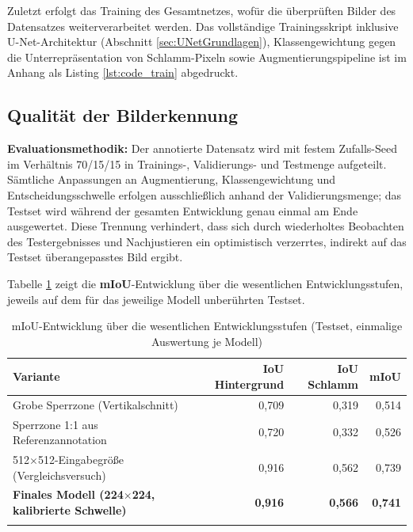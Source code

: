 Zuletzt erfolgt das Training des Gesamtnetzes, wofür die überprüften Bilder des Datensatzes weiterverarbeitet werden. Das vollständige Trainingsskript inklusive U-Net-Architektur (Abschnitt \ref{sec:UNetGrundlagen}), Klassengewichtung gegen die Unterrepräsentation von Schlamm-Pixeln sowie Augmentierungspipeline ist im Anhang als Listing \ref{lst:code_train} abgedruckt.

\subsection{Qualität der Bilderkennung}

\textbf{Evaluationsmethodik:} Der annotierte Datensatz wird mit festem Zufalls-Seed im Verhältnis 70/15/15 in Trainings-, Validierungs- und Testmenge aufgeteilt. Sämtliche Anpassungen an Augmentierung, Klassengewichtung und Entscheidungsschwelle erfolgen ausschließlich anhand der Validierungsmenge; das Testset wird während der gesamten Entwicklung genau einmal am Ende ausgewertet. Diese Trennung verhindert, dass sich durch wiederholtes Beobachten des Testergebnisses und Nachjustieren ein optimistisch verzerrtes, indirekt auf das Testset überangepasstes Bild ergibt.

Tabelle \ref{tab:mIoUErgebnisse} zeigt die \textbf{mIoU}-Entwicklung über die wesentlichen Entwicklungsstufen, jeweils auf dem für das jeweilige Modell unberührten Testset.

\begin{table}[h]
    \centering
    \begin{tabular}{lrrr}
        \hline
        Variante & IoU Hintergrund & IoU Schlamm & mIoU \\
        \hline
        Grobe Sperrzone (Vertikalschnitt) & 0,709 & 0,319 & 0,514 \\
        Sperrzone 1:1 aus Referenzannotation & 0,720 & 0,332 & 0,526 \\
        512$\times$512-Eingabegröße (Vergleichsversuch) & 0,916 & 0,562 & 0,739 \\
        \textbf{Finales Modell (224$\times$224, kalibrierte Schwelle)} & \textbf{0,916} & \textbf{0,566} & \textbf{0,741} \\
        \hline
        \\
    \end{tabular}
    \caption{mIoU-Entwicklung über die wesentlichen Entwicklungsstufen (Testset, einmalige Auswertung je Modell)}
    \label{tab:mIoUErgebnisse}
\end{table}

